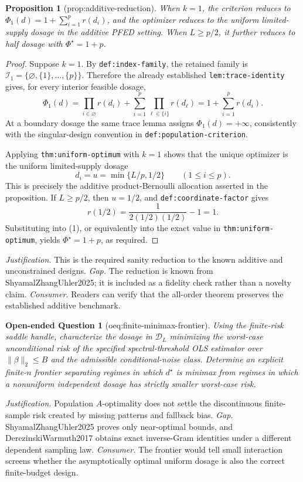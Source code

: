 \documentclass{article}
\newtheorem{proposition}{Proposition}
\newtheorem{openendedquestion}{Open-ended Question}
\begin{document}
\begin{proposition}[prop:additive-reduction]\label{prop:additive-reduction}
When \(k=1\), the criterion reduces to \(\Phi_1(d)=1+\sum_{i=1}^p r(d_i)\), and the optimizer reduces to the uniform limited-supply dosage in the additive PFED setting. When \(L\ge p/2\), it further reduces to half dosage with \(\Phi^\star=1+p\).
\end{proposition}
\begin{proof}
Suppose \(k=1\).  By \texttt{def:index-family}, the retained family is
\(\mathcal I_1=\{\varnothing,\{1\},\ldots,\{p\}\}\).  Therefore the already established \texttt{lem:trace-identity} gives, for every interior feasible dosage,
\[
 \Phi_1(d)
 =\prod_{i\in\varnothing}r(d_i)
  +\sum_{i=1}^p\prod_{\ell\in\{i\}}r(d_\ell)
 =1+\sum_{i=1}^p r(d_i). \tag{1}
\]
At a boundary dosage the same trace lemma assigns \(\Phi_1(d)=+\infty\), consistently with the singular-design convention in \texttt{def:population-criterion}.

Applying \texttt{thm:uniform-optimum} with \(k=1\) shows that the unique optimizer is the uniform limited-supply dosage
\[
 d_i=u=\min\{L/p,1/2\}\qquad(1\le i\le p).
\]
This is precisely the additive product-Bernoulli allocation asserted in the proposition.  If \(L\ge p/2\), then \(u=1/2\), and \texttt{def:coordinate-factor} gives
\[
 r(1/2)=\frac{1}{2(1/2)(1/2)}-1=1.
\]
Substituting into (1), or equivalently into the exact value in \texttt{thm:uniform-optimum}, yields \(\Phi^\star=1+p\), as required.
\end{proof}
\par\smallskip\noindent \textit{Justification.} This is the required sanity reduction to the known additive and unconstrained designs. \textit{Gap.} The reduction is known from ShyamalZhangUhler2025; it is included as a fidelity check rather than a novelty claim. \textit{Consumer.} Readers can verify that the all-order theorem preserves the established additive benchmark.

\begin{openendedquestion}[oeq:finite-minimax-frontier]\label{oeq:finite-minimax-frontier}
Using the finite-risk saddle handle, characterize the dosage in \(\mathcal D_L\) minimizing the worst-case unconditional risk of the specified spectral-threshold OLS estimator over \(\|\beta\|_2\le B\) and the admissible conditional-noise class. Determine an explicit finite-\(n\) frontier separating regimes in which \(d^\star\) is minimax from regimes in which a nonuniform independent dosage has strictly smaller worst-case risk.
\end{openendedquestion}
\par\smallskip\noindent \textit{Justification.} Population \(A\)-optimality does not settle the discontinuous finite-sample risk created by missing patterns and fallback bias. \textit{Gap.} ShyamalZhangUhler2025 proves only near-optimal bounds, and DerezinskiWarmuth2017 obtains exact inverse-Gram identities under a different dependent sampling law. \textit{Consumer.} The frontier would tell small interaction screens whether the asymptotically optimal uniform dosage is also the correct finite-budget design.
\end{document}
